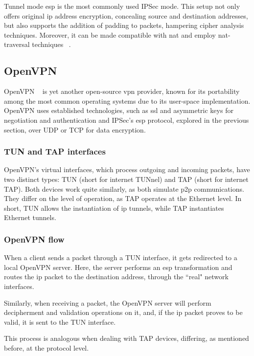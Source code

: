 \documentclass[11pt,twoside,a4paper]{report}
\begin{document}
Tunnel mode \ac{esp} is the most commonly used IPSec mode. This setup not only offers original \ac{ip} address encryption, concealing source and destination addresses, but also supports the addition of padding to packets, hampering cipher analysis techniques. Moreover, it can be made compatible with \ac{nat} and employ \ac{nat}-traversal techniques ~\cite{nam2022high, singh2012nat}.

\subsection{OpenVPN}

OpenVPN ~\cite{ovpnwebsite} is yet another open-source \ac{vpn} provider, known for its portability among the most common operating systems due to its user-space implementation. OpenVPN uses established technologies, such as \ac{ssl} and asymmetric keys for negotiation and authentication and IPSec's \ac{esp} protocol, explored in the previous section, over UDP or TCP for data encryption.

\subsubsection{TUN and TAP interfaces}

OpenVPN's virtual interfaces, which process outgoing and incoming packets, have two distinct types: TUN (short for internet TUNnel) and TAP (short for internet TAP). Both devices work quite similarly, as both simulate \ac{p2p} communications. They differ on the level of operation, as TAP operates at the Ethernet level. In short, TUN allows the instantiation of \ac{ip} tunnels, while TAP instantiates Ethernet tunnels.

\subsubsection{OpenVPN flow}

When a client sends a packet through a TUN interface, it gets redirected to a local OpenVPN server. Here, the server performs an \ac{esp} transformation and routes the \ac{ip} packet to the destination address, through the ``real" network interfaces.

Similarly, when receiving a packet, the OpenVPN server will perform decipherment and validation operations on it, and, if the \ac{ip} packet proves to be valid, it is sent to the TUN interface.

This process is analogous when dealing with TAP devices, differing, as mentioned before, at the protocol level.
\end{document}

